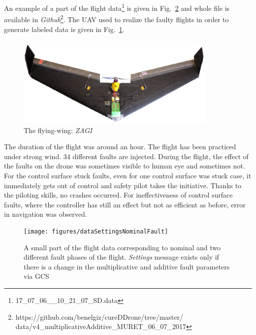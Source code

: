 An example of a part of the flight data\footnote{17\_07\_06\_\_10\_21\_07\_SD.data} is given in Fig.~\ref{fig:dataSettingsNominalFault} and whole file is available in \emph{Github}\footnote{https://github.com/benelgiz/cureDDrone/tree/master/ \\ data/v4\_multiplicativeAdditive\_MURET\_06\_07\_2017}. 
The UAV used to realize the faulty flights in order to generate labeled data is given in Fig.~\ref{fig:zagi}. 

\begin{figure}[h]
\begin{center}
\includegraphics[width=0.87\textwidth]{figures/zagi}    %
\caption{The flying-wing: \emph{ZAGI}} 
\label{fig:zagi}
\end{center}
\end{figure}

The duration of the flight was around an hour. 
The flight has been practiced under strong wind. 
34 different faults are injected.
During the flight, the effect of the faults on the drone was sometimes visible to human eye and sometimes not. 
For the control surface stuck faults, even for one control surface was stuck case, it immediately gets out of control and safety pilot takes the initiative. 
Thanks to the piloting skills, no crashes occurred. 
For ineffectiveness of control surface faults, where the controller has still an effect but not as efficient as before, error in navigation was observed.  

\begin{figure}
\begin{center}
\texttt{[image: figures/dataSettingsNominalFault]}    %
\caption{A small part of the flight data corresponding to nominal and two different fault phases of the flight. \emph{Settings} message exists only if there is a change in the multiplicative and additive fault parameters via GCS} 
\label{fig:dataSettingsNominalFault}
\end{center}
\end{figure}


